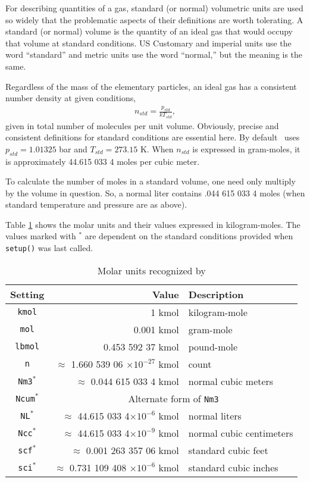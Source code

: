 For describing quantities of a gas, standard (or normal) volumetric units are used so widely that the problematic aspects of their definitions are worth tolerating.  A standard (or normal) volume is the quantity of an ideal gas that would occupy that volume at standard conditions.  US Customary and imperial units use the word ``standard'' and metric units use the word ``normal,'' but the meaning is the same.  

Regardless of the mass of the elementary particles, an ideal gas has a consistent number density at given conditions,
\begin{align}
n_{std} = \frac{p_{std}}{k T_{std}},
\end{align}
given in total number of molecules per unit volume.  Obviously, precise and consistent definitions for standard conditions are essential here.  By default \PM\ uses $p_{std} = 1.01325$ bar and $T_{std} = 273.15$ K.  When $n_{std}$ is expressed in gram-moles, it is approximately 44.615 033 4 moles per cubic meter.

To calculate the number of moles in a standard volume, one need only multiply by the volume in question.  So, a normal liter contains .044 615 033 4 moles (when standard temperature and pressure are as above).

Table \ref{tab:molar} shows the molar units and their values expressed in kilogram-moles.  The values marked with $^*$ are dependent on the standard conditions provided when \verb|setup()| was last called.

\begin{table}
\centering
\caption{Molar units recognized by \PM}\label{tab:molar}
\begin{tabular}{crl}
\hline
Setting & Value & Description\\
\hline
\verb|kmol| & 1 kmol & kilogram-mole\\
\verb|mol| & 0.001 kmol & gram-mole\\
\verb|lbmol| & 0.453 592 37 kmol & pound-mole\\
\verb|n| & $\approx$ 1.660 539 06 $\times 10^{-27}$ kmol & count \\
\verb|Nm3|$^*$ & $\approx$ 0.044 615 033 4 kmol & normal cubic meters\\
\verb|Ncum|$^*$ & \multicolumn{2}{c}{Alternate form of \texttt{Nm3}}\\
\verb|NL|$^*$ & $\approx$ 44.615 033 4$\times 10^{-6}$ kmol & normal liters\\
\verb|Ncc|$^*$ & $\approx$ 44.615 033 4$\times 10^{-9}$ kmol & normal cubic centimeters\\
\verb|scf|$^*$ & $\approx$ 0.001 263 357 06 kmol & standard cubic feet\\
\verb|sci|$^*$ & $\approx$ 0.731 109 408 $\times 10^{-6}$ kmol & standard cubic inches\\
\hline
\end{tabular}
\end{table}

